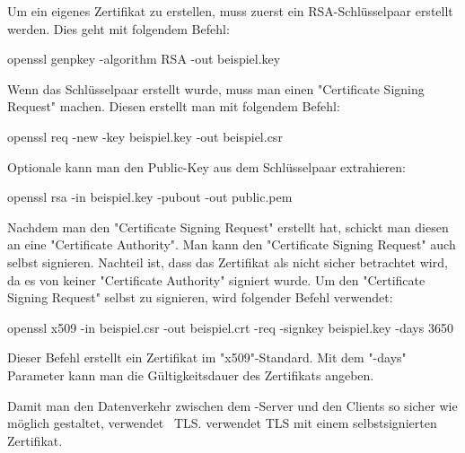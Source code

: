 \pagebreak


Um ein eigenes Zertifikat zu erstellen, muss zuerst ein RSA-Schlüsselpaar erstellt werden. Dies geht mit folgendem Befehl:

{\ttfamily openssl genpkey -algorithm RSA -out beispiel.key}

Wenn das Schlüsselpaar erstellt wurde, muss man einen "Certificate Signing Request" machen. Diesen erstellt man mit folgendem Befehl: 

{\ttfamily openssl req -new -key beispiel.key -out beispiel.csr}

Optionale kann man den Public-Key aus dem Schlüsselpaar extrahieren:

{\ttfamily openssl rsa -in beispiel.key -pubout -out public.pem}

Nachdem man den "Certificate Signing Request" erstellt hat, schickt man diesen an eine "Certificate Authority". Man kann den "Certificate Signing Request" auch selbst signieren. Nachteil ist, dass das Zertifikat als nicht sicher betrachtet wird, da es von keiner "Certificate Authority" signiert wurde. Um den "Certificate Signing Request" selbst zu signieren, wird folgender Befehl verwendet: 

{\ttfamily openssl x509 -in beispiel.csr -out beispiel.crt -req -signkey beispiel.key -days 3650}

Dieser Befehl erstellt ein Zertifikat im "x509"-Standard. Mit dem "-days" Parameter kann man die Gültigkeitsdauer des Zertifikats angeben. \cite{ZertifikateTLS}


Damit man den Datenverkehr zwischen dem \ZELIA-Server und den Clients so sicher wie möglich gestaltet, verwendet \ZELIA\ TLS. \ZELIA verwendet TLS mit einem selbstsignierten Zertifikat.
